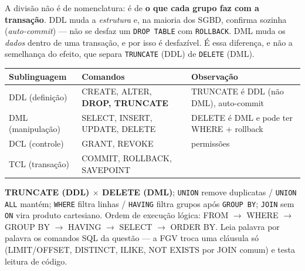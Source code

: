 A divisão não é de nomenclatura: é de \textbf{o que cada grupo faz com a
transação}. DDL muda a \emph{estrutura} e, na maioria dos SGBD, confirma
sozinha (\emph{auto-commit}) --- não se desfaz um \texttt{DROP TABLE} com
\texttt{ROLLBACK}. DML muda os \emph{dados} dentro de uma transação, e por
isso é desfazível. É essa diferença, e não a semelhança do efeito, que separa
\texttt{TRUNCATE} (DDL) de \texttt{DELETE} (DML).

\begin{center}
\begin{tabular}{@{}p{2.6cm}p{4cm}p{4.5cm}@{}}
\toprule
\textbf{Sublinguagem} & \textbf{Comandos} & \textbf{Observação} \\
\midrule
DDL (definição) & CREATE, ALTER, \textbf{DROP, TRUNCATE} & TRUNCATE é DDL (não DML), auto-commit \\
DML (manipulação) & SELECT, INSERT, UPDATE, DELETE & DELETE é DML e pode ter WHERE + rollback \\
DCL (controle) & GRANT, REVOKE & permissões \\
TCL (transação) & COMMIT, ROLLBACK, SAVEPOINT & \\
\bottomrule
\end{tabular}
\end{center}

\begin{pegadinha}
\textbf{TRUNCATE (DDL) $\times$ DELETE (DML)}; \texttt{UNION} remove
duplicatas / \texttt{UNION ALL} mantém; \texttt{WHERE} filtra linhas /
\texttt{HAVING} filtra grupos após \texttt{GROUP BY}; \texttt{JOIN} sem
\texttt{ON} vira produto cartesiano. Ordem de execução lógica: FROM $\to$
WHERE $\to$ GROUP BY $\to$ HAVING $\to$ SELECT $\to$ ORDER BY. Leia palavra
por palavra os comandos SQL da questão --- a FGV troca uma cláusula só
(LIMIT/OFFSET, DISTINCT, ILIKE, NOT EXISTS por JOIN comum) e testa leitura de
código.
\end{pegadinha}


